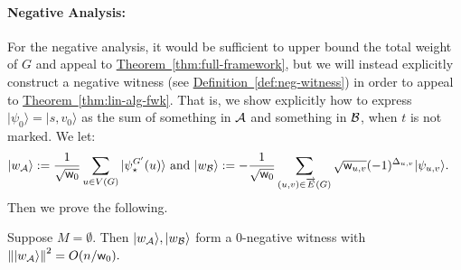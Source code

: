 \documentclass{article}
\newcommand{\thm}[1]{\hyperref[thm:#1]{Theorem~\ref*{thm:#1}}}
\newcommand{\defin}[1]{\hyperref[def:#1]{Definition~\ref*{def:#1}}}
\def\ket#1{{\lvert}#1\rangle}
\renewcommand{\>}{\rangle}
\newcommand{\<}{\langle}
\renewcommand{\(}{\left(}
\renewcommand{\)}{\right)}
\def\norm#1{\left\| #1 \right\|}
\def\w{{\sf w}}
\begin{document}
\paragraph{Negative Analysis:} For the negative analysis, it would be sufficient to upper bound the total weight of $G$ and appeal to \thm{full-framework}, but we will instead explicitly construct a negative witness (see \defin{neg-witness}) in order to appeal to \thm{lin-alg-fwk}. 
That is, we show explicitly how to express $\ket{\psi_0}=\ket{s,v_0}$ as the sum of something in ${\cal A}$ and something in ${\cal B}$, when $t$ is not marked. We let:
\begin{equation}
\begin{split}
\ket{w_{\cal A}} &:= \frac{1}{\sqrt{\w_0}}\sum_{u\in V(G)}\ket{\psi_\star^{G'}(u)}
\mbox{ and }\ket{w_{\cal B}} := -\frac{1}{\sqrt{\w_0}}\sum_{(u,v)\in \overrightarrow{E}(G)}\sqrt{\w_{u,v}}(-1)^{\Delta_{u,v}}\ket{\psi_{u,v}}.
\end{split}\label{eq:welded-neg-witness}
\end{equation}
Then we prove the following.
\begin{lemma}\label{lem:welded-neg-analysis}
Suppose $M=\emptyset$. Then $\ket{w_{\cal A}},\ket{w_{\cal B}}$ form a 0-negative witness with 
$
\norm{\ket{w_{\cal A}}}^2=O(n/\w_0).
$
\end{lemma}
\end{document}
